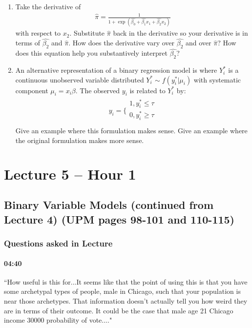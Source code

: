 \documentclass[11pt]{article}
\begin{document}
\begin{enumerate}
\item Take the derivative of 
\begin{eqnarray*}
\hat{\pi} = \frac{1}{1 + \exp{(\hat{\beta_0} + \hat{\beta_1}x_1 + \hat{\beta_2}x_2)}}
\end{eqnarray*}
with respect to $x_2$.  Substitute $\hat{\pi}$ back in the derivative so your derivative is in terms of $\hat{\beta_2}$ and $\hat{\pi}$. How does the derivative vary over $\hat{\beta_2}$ and over $\hat{\pi}$?  How does this equation help you substantively interpret $\hat{\beta_2}$? 

\item An alternative representation of a binary regression model is where $Y_i^*$ is a continuous unobserved variable distributed $Y_i^* \sim f(y_i^*|\mu_i)$ with systematic component $\mu_i = x_i\beta$.  The observed $y_i$ is related to $Y_i^*$ by:
\begin{eqnarray*}
y_i = \Big\{ \begin{array}{cccc} 1 , y_i^* \leq \tau \\ 0 , y_i^* \geq \tau \\ \end{array}  
\end{eqnarray*}
Give an example where this formulation makes sense.  Give an example where the original formulation makes more sense. 
\end{enumerate}


\section{Lecture 5 -- Hour 1}

\subsection{Binary Variable Models (continued from Lecture 4) (UPM pages 98-101 and 110-115)}

\subsubsection{Questions asked in Lecture}

\paragraph{04:40} ``How useful is this for...It seems like that the point of using this is that you have some archetypal types of people, male in Chicago, such that your population is near those archetypes. That information doesn't actually tell you how weird they are in terms of their outcome. It could be the case that male age 21 Chicago income 30000  probability of vote...."
\end{document}
